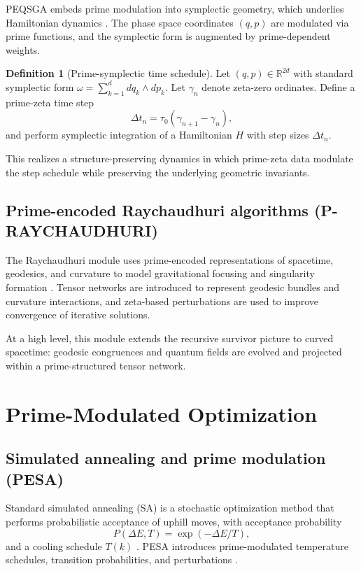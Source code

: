\documentclass[11pt]{article}
\theoremstyle{definition}
\newtheorem{definition}{Definition}[section]
\theoremstyle{plain}
\theoremstyle{remark}
\newcommand{\R}{\mathbb{R}}
\begin{document}
PEQSGA embeds prime modulation into symplectic geometry, which underlies Hamiltonian dynamics \cite[file:334]{P-SYMPLECTICGEO.pdf}. The phase space coordinates $(q,p)$ are modulated via prime functions, and the symplectic form is augmented by prime-dependent weights.

\begin{definition}[Prime-symplectic time schedule]
Let $(q,p)\in\R^{2d}$ with standard symplectic form $\omega = \sum_{k=1}^d dq_k\wedge dp_k$. Let $\gamma_n$ denote zeta-zero ordinates. Define a prime-zeta time step
\[
\Delta t_n = \tau_0 (\gamma_{n+1} - \gamma_n),
\]
and perform symplectic integration of a Hamiltonian $H$ with step sizes $\Delta t_n$.
\end{definition}

This realizes a structure-preserving dynamics in which prime-zeta data modulate the step schedule while preserving the underlying geometric invariants.

\subsection{Prime-encoded Raychaudhuri algorithms (P-RAYCHAUDHURI)}

The Raychaudhuri module uses prime-encoded representations of spacetime, geodesics, and curvature to model gravitational focusing and singularity formation \cite[file:333]{P-RAYCHAUDHURI.pdf}. Tensor networks are introduced to represent geodesic bundles and curvature interactions, and zeta-based perturbations are used to improve convergence of iterative solutions.

At a high level, this module extends the recursive survivor picture to curved spacetime: geodesic congruences and quantum fields are evolved and projected within a prime-structured tensor network.

\section{Prime-Modulated Optimization}

\subsection{Simulated annealing and prime modulation (PESA)}

Standard simulated annealing (SA) is a stochastic optimization method that performs probabilistic acceptance of uphill moves, with acceptance probability
\[
P(\Delta E, T) = \exp(-\Delta E/T),
\]
and a cooling schedule $T(k)$ \cite[web:355]{Simulated_annealing}. PESA introduces prime-modulated temperature schedules, transition probabilities, and perturbations \cite[file:336]{P-SIMANNEALING.pdf}.
\end{document}
